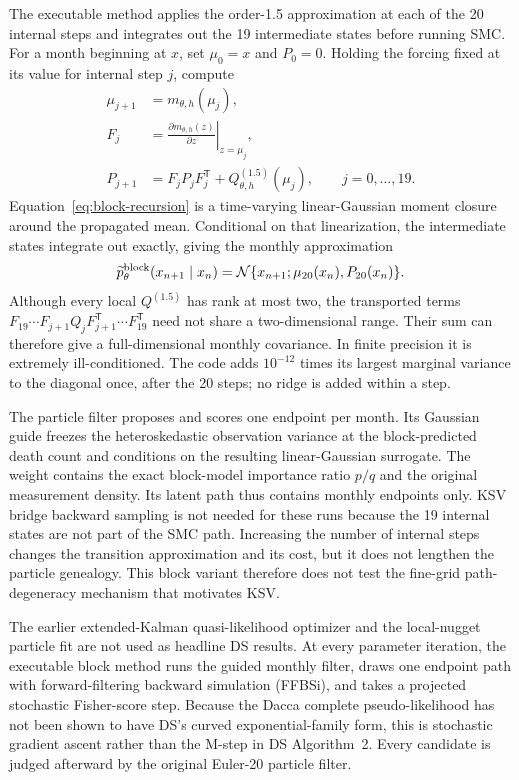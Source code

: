 \documentclass[11pt]{article}
\newcommand{\N}{\mathcal N}
\begin{document}
The executable method applies the order-1.5 approximation at each of the 20
internal steps and integrates out the 19 intermediate states before running
SMC.  For a month beginning at $x$, set $\mu_0=x$ and $P_0=0$.  Holding the
forcing fixed at its value for internal step $j$, compute
\begin{align}
 \mu_{j+1}&=m_{\theta,h}(\mu_j),\\
 F_j&=\left.\frac{\partial m_{\theta,h}(z)}{\partial z}\right|_{z=\mu_j},\\
 P_{j+1}&=F_jP_jF_j^\mathsf T+Q^{(1.5)}_{\theta,h}(\mu_j),
 \qquad j=0,\ldots,19. \label{eq:block-recursion}
\end{align}
Equation~\eqref{eq:block-recursion} is a time-varying linear-Gaussian moment
closure around the propagated mean.  Conditional on that linearization, the
intermediate states integrate out exactly, giving the monthly approximation
\[
 \widetilde p^{\rm block}_{\theta}(x_{n+1}\mid x_n)
 =\N\{x_{n+1};\mu_{20}(x_n),P_{20}(x_n)\}.
\]
Although every local $Q^{(1.5)}$ has rank at most two, the transported terms
$F_{19}\cdots F_{j+1}Q_jF_{j+1}^\mathsf T\cdots F_{19}^\mathsf T$ need not
share a two-dimensional range.  Their sum can therefore give a
full-dimensional monthly covariance.  In finite precision it is extremely
ill-conditioned.  The code adds $10^{-12}$ times its largest marginal variance
to the diagonal once, after the 20 steps; no ridge is added within a step.

The particle filter proposes and scores one endpoint per month.  Its Gaussian
guide freezes the heteroskedastic observation variance at the block-predicted
death count and conditions on the resulting linear-Gaussian surrogate.  The
weight contains the exact block-model importance ratio $p/q$ and the original
measurement density.  Its latent path thus contains monthly endpoints only.
KSV bridge backward sampling is not needed for these runs because the 19
internal states are not part of the SMC path.
Increasing the number of internal steps changes the transition approximation
and its cost, but it does not lengthen the particle genealogy.  This block
variant therefore does not test the fine-grid path-degeneracy mechanism that
motivates KSV.

The earlier extended-Kalman quasi-likelihood optimizer and the local-nugget
particle fit are not used as headline DS results.  At every parameter
iteration, the executable block method runs the guided monthly filter, draws
one endpoint path with forward-filtering backward simulation (FFBSi), and
takes a projected stochastic Fisher-score step.  Because the Dacca complete
pseudo-likelihood
has not been shown to have DS's curved exponential-family form, this is
stochastic gradient ascent rather than the M-step in DS Algorithm~2.  Every
candidate is judged afterward by the original Euler-20 particle filter.
\end{document}
